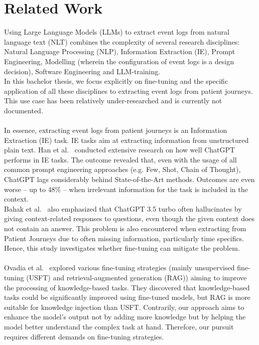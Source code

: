 \section{Related Work}
\label{related_work}
Using Large Language Models (LLMs) to extract event logs from natural language text (NLT) combines the complexity of several research disciplines: Natural Language Processing (NLP), Information Extraction (IE), Prompt Engineering, Modelling (wherein the configuration of event logs is a design decision), Software Engineering and LLM-training.\\
In this bachelor thesis, we focus explicitly on fine-tuning and the specific application of all these disciplines to extracting event logs from patient journeys. This use case has been relatively under-researched and is currently not documented.\\\\
In essence, extracting event logs from patient journeys is an Information Extraction (IE) task. IE tasks aim at extracting information from unstructured plain text. Han et al.~\cite{han_is_2023} conducted extensive research on how well ChatGPT performs in IE tasks. The outcome revealed that, even with the usage of all common prompt engineering approaches (e.g. Few, Shot, Chain of Thought), ChatGPT lags considerably behind State-of-the-Art methods. Outcomes are even worse – up to 48\% – when irrelevant information for the task is included in the context.\\
Bahak et al.~\cite{bahak_evaluating_2023} also emphasized that ChatGPT 3.5 turbo often hallucinates by giving context-related responses to questions, even though the given context does not contain an answer. This problem is also encountered when extracting from Patient Journeys due to often missing information, particularly time specifics. Hence, this study investigates whether fine-tuning can mitigate the problem.\\\\
Ovadia et al.~\cite{ovadia_fine-tuning_2024} explored various fine-tuning strategies (mainly unsupervised fine-tuning (USFT) and retrieval-augmented generation (RAG)) aiming to improve the processing of knowledge-based tasks. They discovered that knowledge-based tasks could be significantly improved using fine-tuned models, but RAG is more suitable for knowledge injection than USFT. Contrarily, our approach aims to enhance the model's output not by adding more knowledge but by helping the model better understand the complex task at hand. Therefore, our pursuit requires different demands on fine-tuning strategies.\\\\
